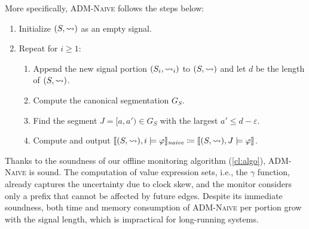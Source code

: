 More specifically, \textsc{ADM-Naive} follows the steps below:
\begin{enumerate}[label*=\arabic*.]
	\item Initialize $(S,{\rightsquigarrow})$ as an empty signal.
	\item Repeat for $i \geq 1$:
	\begin{enumerate}[leftmargin=5pt,label*=\arabic*]
		\item Append the new signal portion $(S_i,{\rightsquigarrow}_i)$ to $(S,{\rightsquigarrow})$ and let $d$ be the length of $(S,{\rightsquigarrow})$.
		\item Compute the canonical segmentation $G_S$.
		\item Find the segment $J = [a, a') \in G_S$ with the largest $a' \leq d-\varepsilon$.
		\item Compute and output  $\llbracket (S, {\rightsquigarrow}), i \models \varphi \rrbracket_{\textit{naive}} \coloneqq \llbracket (S, {\rightsquigarrow}), J \models \varphi \rrbracket$.
	\end{enumerate}
\end{enumerate}
Thanks to the soundness of our offline monitoring algorithm (\cref{cl:algo}), \textsc{ADM-Naive} is sound.
The computation of value expression sets, i.e., the $\gamma$ function, already captures the uncertainty due to clock skew, and the monitor considers only a prefix that cannot be affected by future edges.
Despite its immediate soundness, both time and memory consumption of \textsc{ADM-Naive} per portion grow with the signal length, which is impractical for long-running systems.

